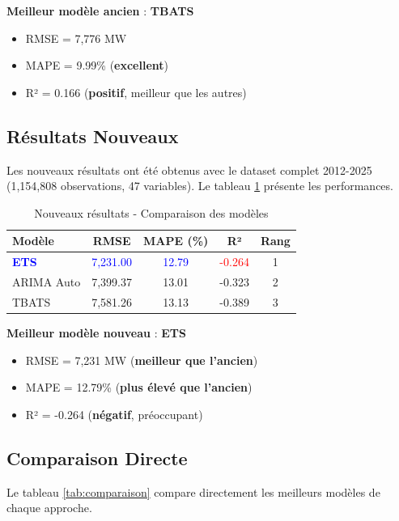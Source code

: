 \documentclass[12pt,a4paper]{article}
\begin{document}
\textbf{Meilleur modèle ancien} : \textbf{TBATS}
\begin{itemize}
    \item RMSE = 7,776 MW
    \item MAPE = 9.99\% (\textbf{excellent})
    \item R² = 0.166 (\textbf{positif}, meilleur que les autres)
\end{itemize}

\subsection{Résultats Nouveaux}

Les nouveaux résultats ont été obtenus avec le dataset complet 2012-2025 (1,154,808 observations, 47 variables). Le tableau \ref{tab:nouveaux} présente les performances.

\begin{table}[h]
\centering
\caption{Nouveaux résultats - Comparaison des modèles}
\label{tab:nouveaux}
\begin{tabular}{lcccc}
\toprule
\textbf{Modèle} & \textbf{RMSE} & \textbf{MAPE (\%)} & \textbf{R²} & \textbf{Rang} \\
\midrule
\textcolor{blue}{\textbf{ETS}} & \textcolor{blue}{7,231.00} & \textcolor{blue}{12.79} & \textcolor{red}{-0.264} & 1 \\
ARIMA Auto & 7,399.37 & 13.01 & -0.323 & 2 \\
TBATS & 7,581.26 & 13.13 & -0.389 & 3 \\
\bottomrule
\end{tabular}
\end{table}

\textbf{Meilleur modèle nouveau} : \textbf{ETS}
\begin{itemize}
    \item RMSE = 7,231 MW (\textbf{meilleur que l'ancien})
    \item MAPE = 12.79\% (\textbf{plus élevé que l'ancien})
    \item R² = -0.264 (\textbf{négatif}, préoccupant)
\end{itemize}

\subsection{Comparaison Directe}

Le tableau \ref{tab:comparaison} compare directement les meilleurs modèles de chaque approche.
\end{document}
